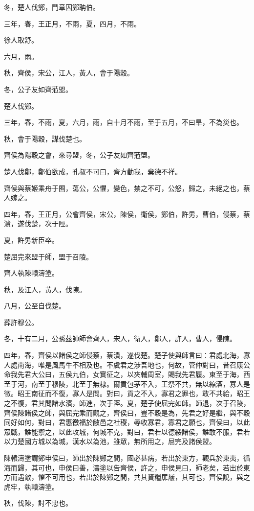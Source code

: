 \begin{pinyinscope}
冬，楚人伐鄭，鬥章囚鄭聃伯。

三年，春，王正月，不雨，夏，四月，不雨。

徐人取舒。

六月，雨。

秋，齊侯，宋公，江人，黃人，會于陽穀。

冬，公子友如齊蒞盟。

楚人伐鄭。

三年，春，不雨，夏，六月，雨，自十月不雨，至于五月，不曰旱，不為災也。

秋，會于陽穀，謀伐楚也。

齊侯為陽穀之會，來尋盟，冬，公子友如齊蒞盟。

楚人伐鄭，鄭伯欲成，孔叔不可曰，齊方勤我，棄德不祥。

齊侯與蔡姬乘舟于囿，蕩公，公懼，變色，禁之不可，公怒，歸之，未絕之也，蔡人嫁之。

四年，春，王正月，公會齊侯，宋公，陳侯，衛侯，鄭伯，許男，曹伯，侵蔡，蔡潰，遂伐楚，次于陘。

夏，許男新臣卒。

楚屈完來盟于師，盟于召陵。

齊人執陳轅濤塗。

秋，及江人，黃人，伐陳。

八月，公至自伐楚。

葬許穆公。

冬，十有二月，公孫茲帥師會齊人，宋人，衛人，鄭人，許人，曹人，侵陳。

四年，春，齊侯以諸侯之師侵蔡，蔡潰，遂伐楚。楚子使與師言曰：君處北海，寡人處南海，唯是風馬牛不相及也。不虞君之涉吾地也，何故，管仲對曰，昔召康公命我先君大公曰，五侯九伯，女實征之，以夾輔周室，賜我先君履。東至于海，西至于河，南至于穆陵，北至于無棣。爾貢包茅不入，王祭不共，無以縮酒，寡人是徵。昭王南征而不復，寡人是問。對曰，貢之不入，寡君之罪也，敢不共給，昭王之不復，君其問諸水濱，師進，次于陘。夏，楚子使屈完如師。師退，次于召陵，齊侯陳諸侯之師，與屈完乘而觀之，齊侯曰，豈不穀是為，先君之好是繼，與不穀同好如何，對曰，君惠徼福於敝邑之社稷，辱收寡君，寡君之願也，齊侯曰，以此眾戰，誰能禦之，以此攻城，何城不克，對曰，君若以德綏諸侯，誰敢不服，君若以力楚國方城以為城，漢水以為池，雖眾，無所用之，屈完及諸侯盟。

陳轅濤塗謂鄭申侯曰，師出於陳鄭之間，國必甚病，若出於東方，觀兵於東夷，循海而歸，其可也，申侯曰善，濤塗以告齊侯，許之，申侯見曰，師老矣，若出於東方而遇敵，懼不可用也，若出於陳鄭之間，共其資糧屝屨，其可也，齊侯說，與之虎牢，執轅濤塗。

秋，伐陳，討不忠也。


\end{pinyinscope}
